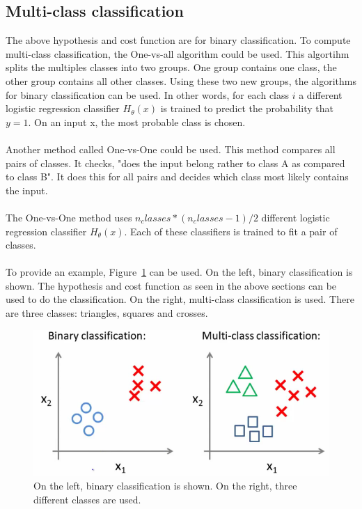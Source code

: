 \subsection{Multi-class classification}
The above hypothesis and cost function are for binary classification. To compute multi-class classification, the One-vs-all algorithm could be used. This algortihm splits the multiples classes into two groups. One group contains one class, the other group contains all other classes. Using these two new groups, the algorithms for binary classification can be used. In other words, for each class $i$ a different logistic regression classifier $H_\theta(x)$ is trained to predict the probability that $y = 1$. On an input x, the most probable class is chosen. \\\\
Another method called One-vs-One could be used. This method compares all pairs of classes. It checks, "does the input belong rather to class A as compared to class B". It does this for all pairs and decides which class most likely contains the input. \\\\
The One-vs-One method uses $n_classes * (n_classes - 1) / 2$ different logistic regression classifier $H_\theta(x)$. Each of these classifiers is trained to fit a pair of classes. \cite{pattern}\\\\
To provide an example, Figure~\ref{fig:multiclass} can be used. On the left, binary classification is shown. The hypothesis and cost function as seen in the above sections can be used to do the classification. On the right, multi-class classification is used. There are three classes: triangles, squares and crosses.
\begin{figure}[H]
\centering
\includegraphics[width=1\textwidth]{Figures/multiclass}
\decoRule
\caption[Multiclass classification]{On the left, binary classification is shown. On the right, three different classes are used. \cite{multiclass}}
\label{fig:multiclass}
\end{figure}
